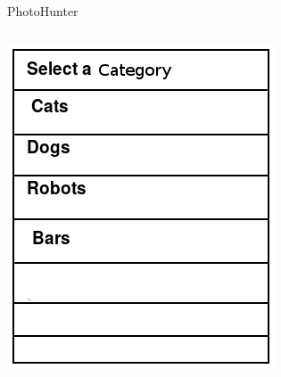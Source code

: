 \documentclass[aspectratio=169]{beamer}
\begin{document}
\begin{frame}{PhotoHunter}
  \begin{columns}[c]
    \begin{column}{0.5\columnwidth}
      \includegraphics[width=\columnwidth]{ss_photohunter_dataset}
    \end{column}
    \begin{column}{0.5\columnwidth}

\end{column}
\end{columns}
\end{frame}
\end{document}
